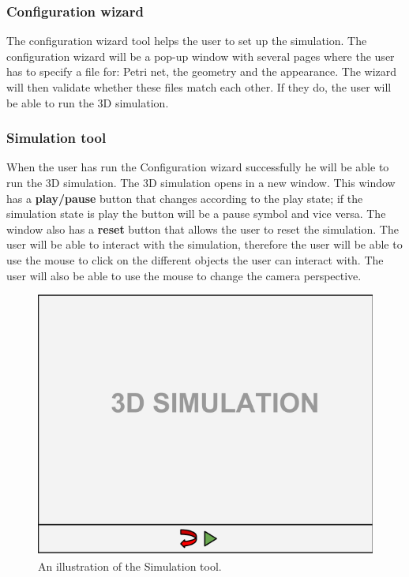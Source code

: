 \subsubsection{Configuration wizard}
The configuration wizard tool helps the user to set up the simulation. The configuration wizard will be a pop-up window with several pages where the user has to specify a file for: Petri net, the geometry and the appearance. The wizard will then validate whether these files match each other. If they do, the user will be able to run the 3D simulation. 

\subsubsection{Simulation tool}
When the user has run the Configuration wizard successfully he will be able to run the 3D simulation. The 3D simulation opens in a new window. This window has a \textbf{play/pause} button that changes according to the play state; if the simulation state is play the button will be a pause symbol and vice versa. The window also has a \textbf{reset} button that allows the user to reset the simulation.
The user will be able to interact with the simulation, therefore the user will be able to use the mouse to click on the different objects the user can interact with. The user will also be able to use the mouse to change the camera perspective.

\begin{figure}[ht]
\begin{center}
\includegraphics[scale=0.5]{image/simulation_tool.png}
\caption{An illustration of the Simulation tool.}
\label{fig:simulation_tool.}
\end{center}
\end{figure}

